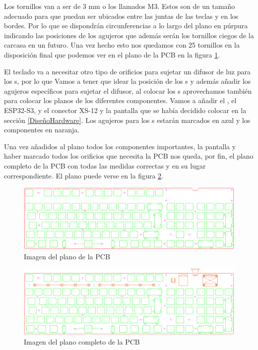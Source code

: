 Los tornillos van a ser de 3 mm o los llamados M3. Estos son de un tamaño adecuado para que puedan ser ubicados entre las juntas de las teclas y en los bordes. Por lo que se dispondrán circunferencias a lo largo del plano en púrpura indicando las posiciones de los agujeros que además serán los tornillos ciegos de la carcasa en un futuro. Una vez hecho esto nos quedamos con 25 tornillos en la disposición final que podemos ver en el plano de la \gls{PCB} en la figura \ref{fig:PlanoPCB}.

El teclado va a necesitar otro tipo de orificios para sujetar un difusor de luz para los s, por lo que Vamos a tener que idear la posición de los s y además añadir los agujeros específicos para sujetar el difusor, al colocar los s aprovechamos también para colocar los planos de los diferentes componentes. Vamos a añadir el , el ESP32-S3, y el conector XS-12 y la pantalla que se había decidido colocar en la sección \ref{DiseñoHardware}. Los agujeros para los s estarán marcados en azul y los componentes en naranja.

Una vez añadidos al plano todos los componentes importantes, la pantalla y haber marcado todos los orificios que necesita la \gls{PCB} nos queda, por fin, el plano completo de la \gls{PCB} con todas las medidas correctas y en su lugar correspondiente. El plano puede verse en la figura \ref{fig:PlanoPCBConTodo}.

\begin{figure}[H]
    \centering
    \includegraphics[width=1\textwidth]{imagenes/Capitulos/Cap05/PlanoPCB.png}
    \caption{Imagen del plano de la \gls{PCB} \cite{Repo:Planos}}
    \label{fig:PlanoPCB}
\end{figure}

\begin{figure}[H]
    \centering
    \includegraphics[width=1\textwidth]{imagenes/Capitulos/Cap05/PlanoConPartes.png}
    \caption{Imagen del plano completo de la \gls{PCB} \cite{Repo:Planos}}
    \label{fig:PlanoPCBConTodo}
\end{figure}

